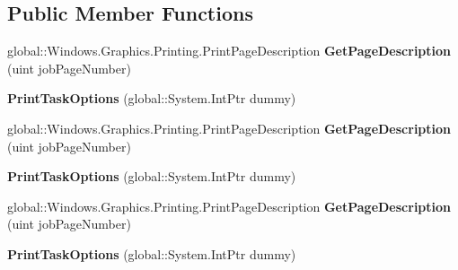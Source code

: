 \subsection*{Public Member Functions}
\begin{DoxyCompactItemize}
\item 
\mbox{\label{class_windows_1_1_graphics_1_1_printing_1_1_print_task_options_a01c2e555d9779be0ac562bd3cc25ee63}} 
global\+::\+Windows.\+Graphics.\+Printing.\+Print\+Page\+Description {\bfseries Get\+Page\+Description} (uint job\+Page\+Number)
\item 
\mbox{\label{class_windows_1_1_graphics_1_1_printing_1_1_print_task_options_a7b2039358cec4b6aa5d9eb767908a6d9}} 
{\bfseries Print\+Task\+Options} (global\+::\+System.\+Int\+Ptr dummy)
\item 
\mbox{\label{class_windows_1_1_graphics_1_1_printing_1_1_print_task_options_a01c2e555d9779be0ac562bd3cc25ee63}} 
global\+::\+Windows.\+Graphics.\+Printing.\+Print\+Page\+Description {\bfseries Get\+Page\+Description} (uint job\+Page\+Number)
\item 
\mbox{\label{class_windows_1_1_graphics_1_1_printing_1_1_print_task_options_a7b2039358cec4b6aa5d9eb767908a6d9}} 
{\bfseries Print\+Task\+Options} (global\+::\+System.\+Int\+Ptr dummy)
\item 
\mbox{\label{class_windows_1_1_graphics_1_1_printing_1_1_print_task_options_a01c2e555d9779be0ac562bd3cc25ee63}} 
global\+::\+Windows.\+Graphics.\+Printing.\+Print\+Page\+Description {\bfseries Get\+Page\+Description} (uint job\+Page\+Number)
\item 
\mbox{\label{class_windows_1_1_graphics_1_1_printing_1_1_print_task_options_a7b2039358cec4b6aa5d9eb767908a6d9}} 
{\bfseries Print\+Task\+Options} (global\+::\+System.\+Int\+Ptr dummy)
\item 
\mbox{\label{class_windows_1_1_graphics_1_1_printing_1_1_print_task_options_a01c2e555d9779be0ac562bd3cc25ee63}} 

\end{DoxyCompactItemize}
